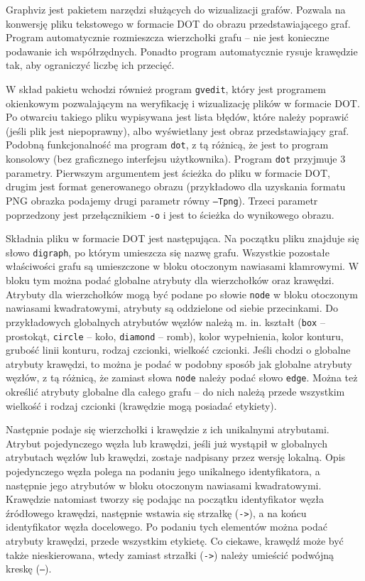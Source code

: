 Graphviz \cite{Graphviz} jest pakietem narzędzi służących do wizualizacji grafów. Pozwala na konwersję pliku tekstowego w formacie DOT do obrazu przedstawiającego graf. Program automatycznie rozmieszcza wierzchołki grafu -- nie jest konieczne podawanie ich współrzędnych. Ponadto program automatycznie rysuje krawędzie tak, aby ograniczyć liczbę ich przecięć. 

W skład pakietu wchodzi również program \texttt{gvedit}, który jest programem okienkowym pozwalającym na weryfikację i wizualizację plików w formacie DOT. Po otwarciu takiego pliku wypisywana jest lista błędów, które należy poprawić (jeśli plik jest niepoprawny), albo wyświetlany jest obraz przedstawiający graf. Podobną funkcjonalność ma program \texttt{dot}, z tą różnicą, że jest to program konsolowy (bez graficznego interfejsu użytkownika). Program \texttt{dot} przyjmuje 3 parametry. Pierwszym argumentem jest ścieżka do pliku w formacie DOT, drugim jest format generowanego obrazu (przykładowo dla uzyskania formatu PNG obrazka podajemy drugi parametr równy \texttt{–Tpng}). Trzeci parametr poprzedzony jest przełącznikiem \texttt{-o} i jest to ścieżka do wynikowego obrazu. 

Składnia pliku w formacie DOT jest następująca. Na początku pliku znajduje się słowo \texttt{digraph}, po którym umieszcza się nazwę grafu. Wszystkie pozostałe właściwości grafu są umieszczone w bloku otoczonym nawiasami klamrowymi. W bloku tym można podać globalne atrybuty dla wierzchołków oraz krawędzi. Atrybuty dla wierzchołków mogą być podane po słowie \texttt{node} w bloku otoczonym nawiasami kwadratowymi, atrybuty są oddzielone od siebie przecinkami. Do przykładowych globalnych atrybutów węzłów należą m. in. kształt (\texttt{box} – prostokąt, \texttt{circle} – koło, \texttt{diamond} – romb), kolor wypełnienia, kolor konturu, grubość linii konturu, rodzaj czcionki, wielkość czcionki. Jeśli chodzi o globalne atrybuty krawędzi, to można je podać w podobny sposób jak globalne atrybuty węzłów, z tą różnicą, że zamiast słowa \texttt{node} należy podać słowo \texttt{edge}. Można też określić atrybuty globalne dla całego grafu -- do nich należą przede wszystkim wielkość i rodzaj czcionki (krawędzie mogą posiadać etykiety). 

Następnie podaje się wierzchołki i krawędzie z ich unikalnymi atrybutami. Atrybut pojedynczego węzła lub krawędzi, jeśli już wystąpił w globalnych atrybutach węzłów lub krawędzi, zostaje nadpisany przez wersję lokalną. Opis pojedynczego węzła polega na podaniu jego unikalnego identyfikatora, a następnie jego atrybutów w bloku otoczonym nawiasami kwadratowymi.  Krawędzie natomiast tworzy się podając na początku identyfikator węzła źródłowego krawędzi, następnie wstawia się strzałkę (\texttt{->}), a na końcu identyfikator węzła docelowego. Po podaniu tych elementów można podać atrybuty krawędzi, przede wszystkim etykietę. Co ciekawe, krawędź może być także nieskierowana, wtedy zamiast strzałki (\texttt{->}) należy umieścić podwójną kreskę (\texttt{--}). 

